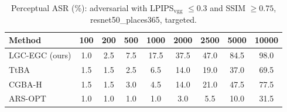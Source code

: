 \begin{table}[t]
\centering\footnotesize
\caption{Perceptual ASR (\%): adversarial with LPIPS$_{\mathrm{vgg}}$ $\le 0.3$ and SSIM $\ge 0.75$, resnet50\_places365, targeted.}
\begin{tabular}{lcccccccc}
\toprule
Method & 100 & 200 & 500 & 1000 & 2000 & 2500 & 5000 & 10000 \\
\midrule
LGC-EGC (ours) & 1.0 & 2.5 & 7.5 & 17.5 & 37.5 & 47.0 & 84.5 & 98.0 \\
TtBA & 1.5 & 1.5 & 2.5 & 6.5 & 14.0 & 19.0 & 37.0 & 69.5 \\
CGBA-H & 1.5 & 1.5 & 3.0 & 4.5 & 14.0 & 21.0 & 47.5 & 77.5 \\
ARS-OPT & 1.0 & 1.0 & 1.0 & 1.0 & 3.0 & 5.5 & 10.0 & 31.5 \\
\bottomrule
\end{tabular}
\end{table}

